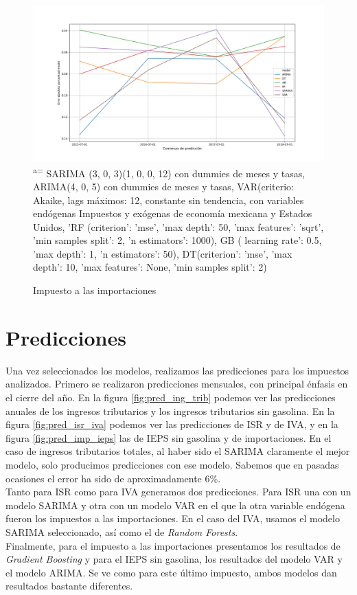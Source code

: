 \documentclass[a4paper, 11pt]{article}
\begin{document}
\begin{figure}[hbt!]
    \centering
     \caption{Impuesto a las importaciones}
     \label{fig:imps}
     \includegraphics[scale = 0.4]{figures/importaciones_neto_(mdp)_r_prec_cierre}
      \small\textsuperscript{a=} SARIMA (3, 0, 3)(1, 0, 0, 12) con dummies de meses y tasas, ARIMA(4, 0, 5) con dummies de meses y tasas, VAR(criterio: Akaike, lags máximos: 12, constante sin tendencia, con variables endógenas Impuestos y exógenas de economía mexicana y Estados Unidos,  'RF (criterion': 'mse', 'max depth': 50, 'max features': 'sqrt', 'min samples split': 2, 'n estimators': 1000), GB ( learning rate': 0.5, 'max depth': 1, 'n estimators': 50),  DT(criterion': 'mse', 'max depth': 10, 'max features': None, 'min samples split': 2)     
\end{figure}
\newpage
\newpage
\FloatBarrier

\section*{Predicciones}
Una vez seleccionados los modelos, realizamos las predicciones para los impuestos analizados. Primero se realizaron predicciones mensuales, con principal énfasis en el cierre del año. En la figura \ref{fig:pred_ing_trib} podemos ver las predicciones anuales de los ingresos tributarios y los ingresos tributarios sin gasolina. En la figura \ref{fig:pred_isr_iva} podemos ver las predicciones de ISR y de IVA, y en la figura \ref{fig:pred_imp_ieps} las de IEPS sin gasolina y de importaciones. En el caso de ingresos tributarios totales, al haber sido el SARIMA claramente el mejor modelo, solo producimos predicciones con ese modelo. Sabemos que en pasadas ocasiones el error ha sido de aproximadamente 6\%.\\
Tanto para ISR como para IVA generamos dos predicciones. Para ISR una con un modelo SARIMA y otra con un modelo VAR en el que la otra variable endógena fueron los impuestos a las importaciones. En el caso del IVA, usamos el modelo SARIMA seleccionado, así como el de \textit{Random Forests}.\\
Finalmente, para el impuesto a las importaciones presentamos los resultados de \textit{Gradient Boosting} y para el IEPS sin gasolina, los resultados del modelo VAR y el modelo ARIMA. Se ve como para este último impuesto, ambos modelos dan resultados bastante diferentes.
\end{document}
